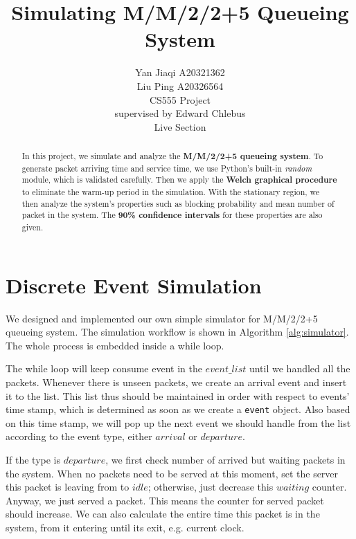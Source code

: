 \documentclass[12pt]{article}  %
\title{Simulating M/M/2/2+5 Queueing System}
\author{Yan Jiaqi A20321362\\
        Liu Ping A20326564\\
CS555 Project\\
supervised by
Edward Chlebus\\
Live Section
}
\theoremstyle{definition}
\theoremstyle{remark}
\begin{document}
\maketitle

\begin{abstract}
In this project, we simulate and analyze the \textbf{M/M/2/2+5 queueing system}. 
To generate packet arriving time and service time, we use Python's built-in \textit{random} module, which is validated carefully.
Then we apply the \textbf{Welch graphical procedure} to eliminate the warm-up period in the simulation.
With the stationary region, we then analyze the system's properties such as blocking probability and mean number of packet in the system.
The \textbf{90\% confidence intervals} for these properties are also given.
\end{abstract}

\newpage
\tableofcontents

\newpage
\section{Discrete Event Simulation}\label{sec:des}
We designed and implemented our own simple simulator for M/M/2/2+5 queueing system.
The simulation workflow is shown in Algorithm \ref{alg:simulator}.
The whole process is embedded inside a while loop.

The while loop will keep consume event in the $event\_list$ until we handled all the packets.
Whenever there is unseen packets, we create an arrival event and insert it to the list.
This list thus should be maintained in order with respect to events' time stamp, which is determined as soon as we create a \texttt{event} object.
Also based on this time stamp, we will pop up the next event we should handle from the list according to the event type, either $arrival$ or $departure$.

If the type is $departure$, we first check number of arrived but waiting packets in the system.
When no packets need to be served at this moment, set the server this packet is leaving from to $idle$;
otherwise, just decrease this $waiting$ counter.
Anyway, we just served a packet.
This means the counter for served packet should increase.
We can also calculate the entire time this packet is in the system, from it entering until its exit, e.g. current clock.
\end{document}
